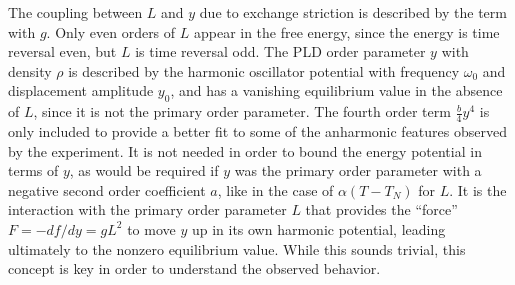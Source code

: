 The coupling between $L$ and $y$ due to exchange striction is described by the term with $g$.
Only even orders of $L$ appear in the free energy, since the energy is time reversal even, but $L$ is time reversal odd.
The PLD order parameter $y$ with density $\rho$ is described by the harmonic oscillator potential with frequency $\omega_0$ and displacement amplitude $y_0$, and has a vanishing equilibrium value in the absence of $L$, since it is not the primary order parameter.
The fourth order term $\frac{b}{4}y^4$ is only included to provide a better fit to some of the anharmonic features observed by the experiment.
It is not needed in order to bound the energy potential in terms of $y$, as would be required if $y$ was the primary order parameter with a negative second order coefficient $a$, like in the case of $\alpha(T-T_N)$ for $L$.
It is the interaction with the primary order parameter $L$ that provides the ``force'' $F = -df/dy = gL^2$ to move $y$ up in its own harmonic potential, leading ultimately to the nonzero equilibrium value.
While this sounds trivial, this concept is key in order to understand the observed behavior.

